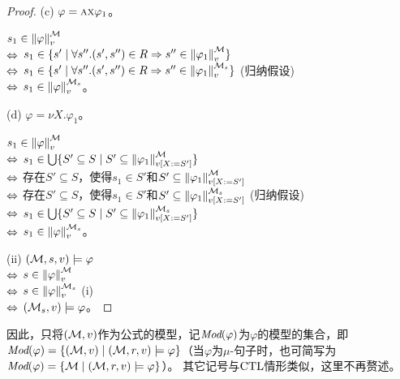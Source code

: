 \begin{proof}
	(c) $\varphi = \textsc{a}\textsc{x} \varphi_1$。
	
	$s_1 \in \left\|\varphi\right\|_{v}^{{\cal M}}$\\
	$\Leftrightarrow$  $s_1 \in \{s' \mid \forall s''.(s',s'') \in R \Rightarrow s''\in \left\|\varphi_1\right\|_{v}^{{\cal M}}\}$\\
	$\Leftrightarrow$ $s_1 \in  \{s' \mid \forall s''.(s',s'') \in R \Rightarrow s''\in \left\|\varphi_1\right\|_{v}^{{\cal M}_s}\}$ \hfill (归纳假设)\\
	$\Leftrightarrow$ $s_1 \in \left\|\varphi\right\|_{v}^{{\cal M}_s}$。
	
	(d) $\varphi = \nu X. \varphi_1$。
	
	$s_1 \in \left\|\varphi\right\|_{v}^{{\cal M}}$\\
	$\Leftrightarrow$ $s_1\in \bigcup \{S' \subseteq S \mid S' \subseteq \left\|\varphi_1\right\|_{v[X:=S']}^{{\cal M}}\}$ \\
	$\Leftrightarrow$ 存在$S' \subseteq S$，使得$s_1 \in S'$和$S' \subseteq \left\|\varphi_1\right\|_{v[X:=S']}^{{\cal M}}$\\
	$\Leftrightarrow$ 存在$S' \subseteq S$，使得$s_1 \in S'$和$S' \subseteq \left\|\varphi_1\right\|_{v[X:=S']}^{{\cal M}_s}$ \hfill (归纳假设)\\
	$\Leftrightarrow$ $s_1 \in \bigcup \{S' \subseteq S \mid S' \subseteq \left\|\varphi_1\right\|_{v[X:=S']}^{{\cal M}_s}\}$\\
	$\Leftrightarrow$ $s_1 \in  \left\|\varphi\right\|_{v}^{{\cal M}_s}$。
	
	(ii) $({\cal M},s,v) \models \varphi$ \\
	$\Leftrightarrow$ $s \in \left\|\varphi\right\|_{v}^{{\cal M}}$ \\
	$\Leftrightarrow$ $s \in \left\|\varphi\right\|_{v}^{{\cal M}_s}$ \hfill (i)\\
	$\Leftrightarrow$ $({\cal M}_s, v) \models \varphi$。
\end{proof}

因此，只将$({\cal M},v)$作为公式的模型，记$\textit{Mod}(\varphi)$为$\varphi$的模型的集合，即$\textit{Mod}(\varphi) = \{({\cal M},v) \mid ({\cal M},r,v) \models \varphi\}$（当$\varphi$为$\mu$-句子时，也可简写为$\textit{Mod}(\varphi) = \{{\cal M}\mid ({\cal M},r,v) \models \varphi\}$）。
其它记号与$\textrm{CTL}$情形类似，这里不再赘述。

